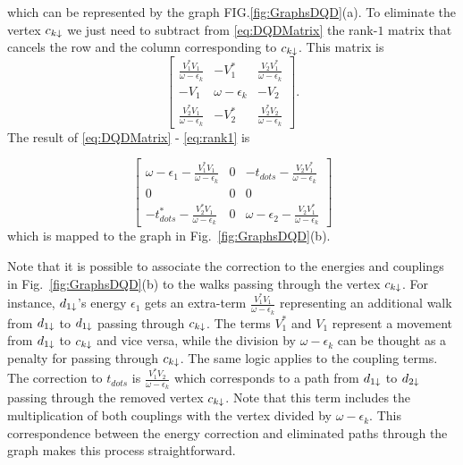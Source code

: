\documentclass[showpacs,aps,prb,reprint,superscriptaddress]{revtex4-2}
\begin{document}
\noindent which can be represented by the graph FIG.\ref{fig:GraphsDQD}(a). To eliminate the vertex $c_{k\downarrow}$ we just need to subtract from \eqref{eq:DQDMatrix} the rank-$1$ matrix that cancels the row and the column corresponding to $c_{k\downarrow}$. This matrix is 
\begin{equation}
        \left[\begin{array}{ccc}
    \frac{V_{1}^{*}V_{1}}{\omega-\epsilon_{k}} & -V_{1}^{*} & \frac{V_{2}V_{1}^{*}}{\omega-\epsilon_{k}}\\
    -V_{1} & \omega-\epsilon_{k} & -V_{2}\\
    \frac{V_{2}^{*}V_{1}}{\omega-\epsilon_{k}} & -V_{2}^{*} & \frac{V_{2}^{*}V_{2}}{\omega-\epsilon_{k}}
    \end{array}\right]. \label{eq:rank1}
\end{equation}
The result of \eqref{eq:DQDMatrix} -  \eqref{eq:rank1} is 

\begin{equation}
        \left[\begin{array}{ccc}
    \omega-\epsilon_{1}-\frac{V_{1}^{*}V_{1}}{\omega-\epsilon_{k}} & 0 & -t_{dots}-\frac{V_{2}V_{1}^{*}}{\omega-\epsilon_{k}}\\
    0 & 0 & 0\\
    -t_{dots}^{*}-\frac{V_{2}^{*}V_{1}}{\omega-\epsilon_{k}} & 0 & \omega-\epsilon_{2}-\frac{V_{2}V_{1}^{*}}{\omega-\epsilon_{k}}
    \end{array}\right]
\end{equation}
\noindent which is mapped to the graph in Fig.\ \ref{fig:GraphsDQD}(b).

Note that it is possible to associate the correction to the energies and couplings in Fig.\ \ref{fig:GraphsDQD}(b) to the walks passing through the vertex $c_{k\downarrow}$.  For instance, $d_{1\downarrow}$'s energy $\epsilon_1$ gets an extra-term $\frac{V_{1}^{*}V_{1}}{\omega-\epsilon_{k}}$ representing an additional walk  from $d_{1\downarrow}$ to $d_{1\downarrow}$ passing through  $c_{k\downarrow}$. The terms $V_1^*$ and $V_1$ represent a movement from $d_{1\downarrow}$ to $c_{k\downarrow}$ and vice versa, while the division by $\omega-\epsilon_{k}$ can be thought as a penalty for  passing through $c_{k\downarrow}$.  The same logic applies to the  coupling terms. The correction to $t_{dots}$ is $\frac{V_{1}^{*}V_{2}}{\omega-\epsilon_{k}}$ which corresponds to a path from $d_{1\downarrow}$ to $d_{2\downarrow}$ passing through the removed vertex $c_{k\downarrow}$. Note that this term includes the multiplication of both couplings with the vertex divided by $\omega-\epsilon_k$. This correspondence between the energy correction and eliminated paths through the graph makes this process straightforward. 
\end{document}
